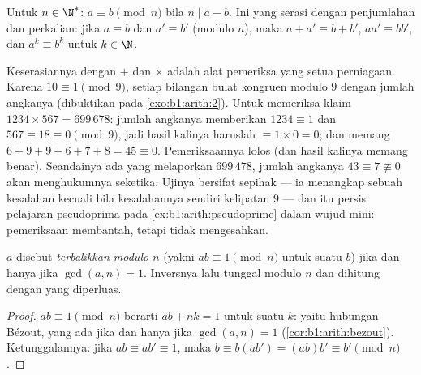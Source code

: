 \begin{definition}\label{def:b1:arith:congruence}
Untuk $n \in \N^*$: $a \equiv b \pmod n$ bila $n \mid
a - b$. Ini  yang serasi dengan penjumlahan dan
perkalian: jika $a \equiv b$ dan $a' \equiv b'$ (modulo $n$), maka
$a + a' \equiv b + b'$, $aa' \equiv bb'$, dan $a^k \equiv b^k$ untuk
$k \in \N$.
\end{definition}

\begin{example}\label{ex:b1:arith:castingnines}
Keserasiannya dengan $+$ dan $\times$ adalah alat pemeriksa yang setua
perniagaan. Karena $10 \equiv 1 \pmod 9$, setiap bilangan bulat
kongruen modulo $9$ dengan jumlah angkanya (dibuktikan pada
\cref{exo:b1:arith:2}). Untuk memeriksa klaim $1234 \times 567 =
699\,678$: jumlah angkanya memberikan $1234 \equiv 1$ dan $567 \equiv 18
\equiv 0 \pmod 9$, jadi hasil kalinya haruslah $\equiv 1 \times 0 =
0$; dan memang $6 + 9 + 9 + 6 + 7 + 8 = 45 \equiv 0$. Pemeriksaannya
lolos (dan hasil kalinya memang benar). Seandainya ada yang melaporkan
$699\,478$, jumlah angkanya $43 \equiv 7 \not\equiv 0$ akan
menghukumnya seketika. Ujinya bersifat sepihak --- ia menangkap sebuah
kesalahan kecuali bila kesalahannya sendiri kelipatan $9$ --- dan itu
persis pelajaran pseudoprima pada
\cref{ex:b1:arith:pseudoprime} dalam wujud mini: pemeriksaan 
membantah, tetapi tidak mengesahkan.
\end{example}

\begin{proposition}\label{prop:b1:arith:invmod}
$a$ disebut \emph{terbalikkan modulo $n$} (yakni $ab \equiv 1 \pmod n$ untuk suatu
$b$) jika dan hanya jika $\gcd(a, n) = 1$. Inversnya lalu tunggal modulo
$n$ dan dihitung dengan  yang diperluas.
\end{proposition}

\begin{proof}
$ab \equiv 1 \pmod n$ berarti $ab + nk = 1$ untuk suatu $k$: yaitu hubungan
Bézout, yang ada jika dan hanya jika $\gcd(a,n) = 1$
(\cref{cor:b1:arith:bezout}). Ketunggalannya: jika $ab \equiv ab' \equiv 1$,
maka $b \equiv b(ab') = (ab)b' \equiv b' \pmod n$.
\end{proof}

